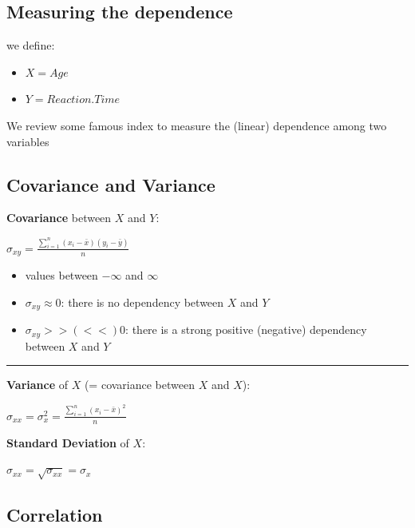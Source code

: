 \documentclass[]{article}
\providecommand{\tightlist}{%
  \setlength{\itemsep}{0pt}\setlength{\parskip}{0pt}}
\begin{document}
\hypertarget{measuring-the-dependence}{%
\subsection{Measuring the dependence}\label{measuring-the-dependence}}

we define:

\begin{itemize}
\tightlist
\item
  \(X=Age\)\\
\item
  \(Y=Reaction.Time\)
\end{itemize}

We review some famous index to measure the (linear) dependence among two
variables

\hypertarget{covariance-and-variance}{%
\subsection{Covariance and Variance}\label{covariance-and-variance}}

\textbf{Covariance} between \(X\) and \(Y\):

\(\sigma_{xy}=\frac{\sum_{i=1} ^ n (x_i- \bar{x}) (y_i- \bar{y} )}{n}\)

\begin{itemize}
\tightlist
\item
  values between \(- \infty\) and \(\infty\)\\
\item
  \(\sigma_{xy} \approx 0\): there is no dependency between \(X\) and
  \(Y\)\\
\item
  \(\sigma_{xy} >> (<<) 0\): there is a strong positive (negative)
  dependency between \(X\) and \(Y\)
\end{itemize}

\begin{center}\rule{0.5\linewidth}{\linethickness}\end{center}

\textbf{Variance} of \(X\) (= covariance between \(X\) and \(X\)):

\(\sigma_{xx}=\sigma_{x} ^ 2= \frac{\sum_{i=1} ^ n (x_i- \bar{x}) ^ 2}{n}\)

\textbf{Standard Deviation} of \(X\):

\(\sigma_{xx}=\sqrt{\sigma_{xx}}=\sigma_{x}\)

\hypertarget{correlation}{%
\subsection{Correlation}\label{correlation}}
\end{document}
